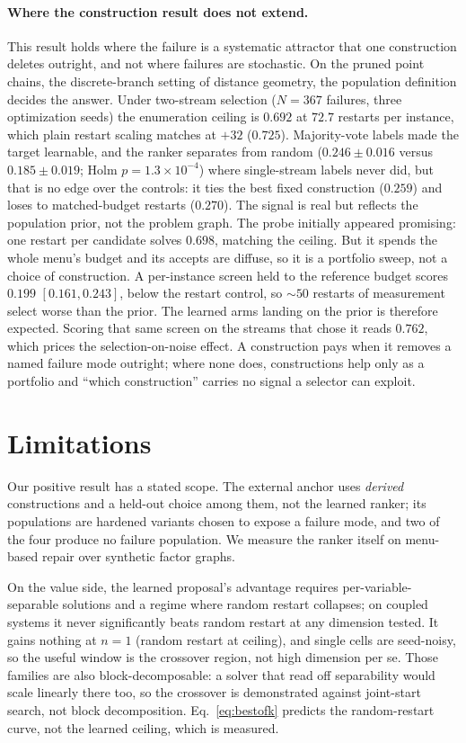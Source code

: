 \documentclass[letterpaper]{article} %
\begin{document}
\paragraph{Where the construction result does not extend.}
This result holds where the failure is a systematic attractor that one construction deletes
outright, and not where failures are stochastic. On the pruned point chains, the
discrete-branch setting of distance geometry, the population definition decides the answer. Under two-stream selection ($N{=}367$ failures, three optimization seeds) the enumeration
ceiling is $0.692$ at $72.7$ restarts per instance, which plain restart scaling matches at
$+32$ ($0.725$). Majority-vote labels made the target learnable, and the ranker separates from random
($0.246 \pm 0.016$ versus $0.185 \pm 0.019$; Holm $p{=}1.3{\times}10^{-4}$) where
single-stream labels never did, but that is no edge over the controls: it ties the best fixed
construction ($0.259$) and loses to matched-budget restarts ($0.270$). The signal is real but reflects the population prior, not the problem graph. The probe initially appeared promising: one restart per candidate solves $0.698$, matching
the ceiling. But it spends the whole menu's budget and its accepts are diffuse, so it is a
portfolio sweep, not a choice of construction. A per-instance screen held to the reference
budget scores $0.199$ $[0.161, 0.243]$, below the restart control, so ${\sim}50$ restarts of
measurement select worse than the prior. The learned arms landing on the prior is therefore expected. Scoring that same screen on
the streams that chose it reads $0.762$, which prices the selection-on-noise effect. A
construction pays when it removes a named failure mode outright; where none does,
constructions help only as a portfolio and ``which construction'' carries no signal a
selector can exploit.

\section{Limitations}
\label{sec:limitations}

Our positive result has a stated scope. The external anchor uses \emph{derived} constructions
and a held-out choice among them, not the learned ranker; its populations are hardened
variants chosen to expose a failure mode, and two of the four produce no failure population. We measure the ranker itself on menu-based repair over synthetic factor
graphs.

On the value side, the learned proposal's advantage requires per-variable-separable
solutions and a regime where random restart collapses; on coupled systems it never
significantly beats random restart at any dimension tested. It gains nothing at $n = 1$ (random restart at ceiling), and single cells are seed-noisy, so
the useful window is the crossover region, not high dimension per se. Those families are also
block-decomposable: a solver that read off separability would scale linearly there too, so
the crossover is demonstrated against joint-start search, not block decomposition. Eq.~\eqref{eq:bestofk} predicts the random-restart curve, not the learned ceiling, which
is measured.
\end{document}
